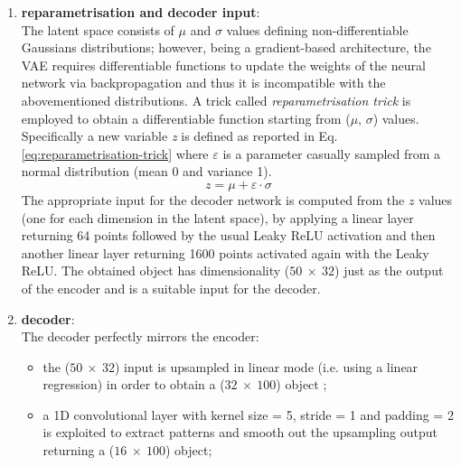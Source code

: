 \begin{enumerate}
\begin{itemize}
        \item secondly, the flattened data are passed through a linear layer (\texttt{nn.Linear}) which further reduce the dimensionality to 64 points;
        \item thirdly, a Leaky ReLU activation with $\alpha=0.1$ is applied;
        \item lastly, parameters of the latent space are obtained separately with another linear layer (\texttt{nn.Linear}) that maps the 64 activated points to a number of ($\mu$, $\sigma$) couples: said number is defined with the appropriate parameter and is the dimension of the latent space.
    \end{itemize}
    \item \textbf{reparametrisation and decoder input}:\\
    The latent space consists of $\mu$ and $\sigma$ values defining non-differentiable Gaussians distributions; however, being a gradient-based architecture, the \ac{VAE} requires differentiable functions to update the weights of the neural network via backpropagation and thus it is incompatible with the abovementioned distributions. A trick called \textit{reparametrisation trick} is employed to obtain a differentiable function starting from ($\mu$, $\sigma$) values. Specifically a new variable \textit{z} is defined as reported in Eq. \ref{eq:reparametrisation-trick} where $\varepsilon$ is a parameter casually sampled from a normal distribution (mean 0 and variance 1).
    \begin{equation}
        \label{eq:reparametrisation-trick}
        z = \mu + \varepsilon \cdot \sigma
    \end{equation}
    The appropriate input for the decoder network is computed from the $z$ values (one for each dimension in the latent space), by applying a linear layer returning 64 points followed by the usual Leaky ReLU activation and then another linear layer returning 1600 points activated again with the Leaky ReLU. The obtained object has dimensionality ($50~\times~32$) just as the output of the encoder and is a suitable input for the decoder.
    \item \textbf{decoder}:\\
    The decoder perfectly mirrors the encoder: 
    \begin{itemize}
        \item the ($50~\times~32$) input is upsampled in linear mode (i.e. using a linear regression) in order to obtain a ($32~\times~100$) object ;
        \item a 1D convolutional layer with kernel size = 5, stride = 1 and padding = 2 is exploited to extract patterns and smooth out the upsampling output returning a ($16~\times~100$) object;

\end{itemize}
\end{enumerate}
